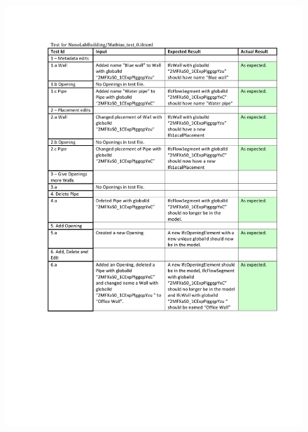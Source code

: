 \begin{figure}[ht]
    \centering
        \centerline{\includegraphics[width=150mm]{images/Test2.pdf}}
    \caption{}
    \label{fig:test2}
\end{figure}
